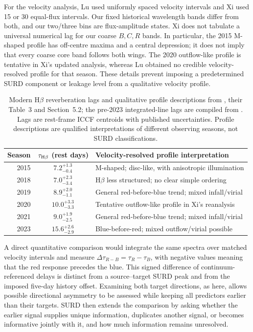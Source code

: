 \documentclass[fleqn,usenatbib]{mnras}
\newenvironment{SURDtable}{\begin{table}}{\end{table}}
\begin{document}
For the velocity analysis, Lu used uniformly spaced velocity intervals and Xi used 15 or 30 equal-flux intervals. Our fixed historical wavelength bands differ from both, and our two/three bins are flux-amplitude states. Xi does not tabulate a universal numerical lag for our coarse $B,C,R$ bands. In particular, the 2015 M-shaped profile has off-centre maxima and a central depression; it does not imply that every coarse core band follows both wings. The 2020 outflow-like profile is tentative in Xi's updated analysis, whereas Lu obtained no credible velocity-resolved profile for that season. These details prevent imposing a predetermined SURD component or leakage level from a qualitative velocity profile.

\begin{SURDtable}
\centering
\caption{Modern H$\beta$ reverberation lags and qualitative profile descriptions from \citet{Xi2025}, their Table~3 and Section~5.2; the pre-2023 integrated-line lags are compiled from \citet{Lu2022}. Lags are rest-frame ICCF centroids with published uncertainties. Profile descriptions are qualified interpretations of different observing seasons, not SURD classifications.}
\label{tab:ep_xi}
\small
\begin{tabular}{rcl}
\toprule
Season & $\tau_{\rm H\beta}$ (rest days) & Velocity-resolved profile interpretation \\
\midrule
2015 & $7.2^{+1.3}_{-0.4}$ & M-shaped; disc-like, with anisotropic illumination \\
2018 & $7.0^{+2.3}_{-3.4}$ & H$\beta$ less structured; no clear simple ordering \\
2019 & $8.9^{+2.0}_{-1.1}$ & General red-before-blue trend; mixed infall/virial \\
2020 & $10.0^{+3.3}_{-3.3}$ & Tentative outflow-like profile in Xi's reanalysis \\
2021 & $9.0^{+1.9}_{-2.5}$ & General red-before-blue trend; mixed infall/virial \\
2023 & $15.6^{+2.6}_{-2.9}$ & Blue-before-red; mixed outflow/virial possible \\
\bottomrule
\end{tabular}
\end{SURDtable}

A direct quantitative comparison would integrate the same spectra over matched velocity intervals and measure $\Delta\tau_{R-B}=\tau_R-\tau_B$, with negative values meaning that the red response precedes the blue. This signed difference of continuum-referenced delays is distinct from a source--target SURD peak and from the imposed five-day history offset. Examining both target directions, as here, allows possible directional asymmetry to be assessed while keeping all predictors earlier than their targets. SURD then extends the comparison by asking whether the earlier signal supplies unique information, duplicates another signal, or becomes informative jointly with it, and how much information remains unresolved.
\end{document}
